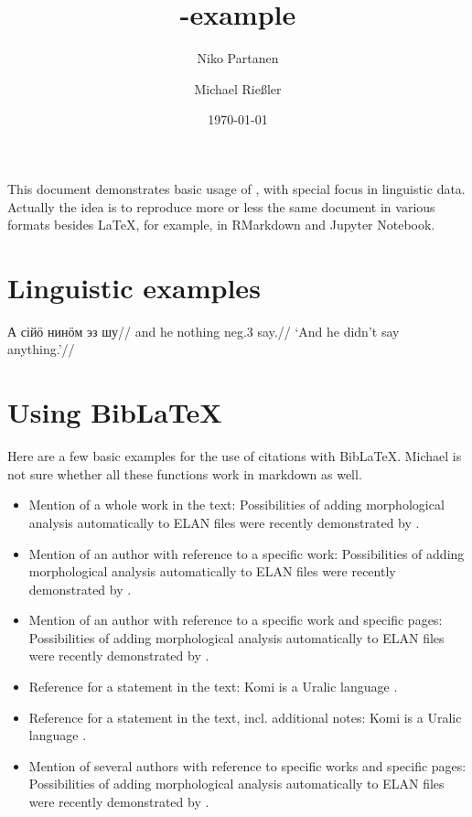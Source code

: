 \documentclass[a4paper, 12pt, english]{article}
\title{\XeLaTeX-example}
\author{
	Niko Partanen
	\and
	Michael Rießler
	}
\date{\today}
\begin{document}
\maketitle 

This document demonstrates basic usage of \XeLaTeX, with special focus in linguistic data. Actually the idea is to reproduce more or less the same document in various formats besides LaTeX, for example, in RMarkdown and Jupyter Notebook.


\section{Linguistic examples}

\ex
\begingl
\gla А сійӧ нинӧм эз шу//
\glb and he nothing neg.3 say.//
\glft ‘And he didn't say anything.’//
\endgl
\xe 

\section{Using BibLaTeX}

Here are a few basic examples for the use of citations with BibLaTeX. Michael is not sure whether all these functions work in markdown as well.

\begin{itemize}
\item Mention of a whole work in the text:
	\subitem Possibilities of adding morphological analysis automatically to ELAN files were recently demonstrated by \cite{gerstenbergerEtAl2017b}.
\item Mention of an author with reference to a specific work:
	\subitem Possibilities of adding morphological analysis automatically to ELAN files were recently demonstrated by \textcite{gerstenbergerEtAl2017b}.
\item Mention of an author with reference to a specific work and specific pages:
	\subitem Possibilities of adding morphological analysis automatically to ELAN files were recently demonstrated by \textcite[10-11]{gerstenbergerEtAl2017b}.
\item Reference for a statement in the text:
	\subitem Komi is a Uralic language \parencite[2]{gerstenbergerEtAl2017b}.
\item Reference for a statement in the text, incl. additional notes:
	\subitem Komi is a Uralic language \parencite[against the statement made by][4]{gerstenbergerEtAl2017b}.
\item Mention of several authors with reference to specific works and specific pages:
	\subitem Possibilities of adding morphological analysis automatically to ELAN files were recently demonstrated by \textcites[10-11]{gerstenbergerEtAl2017b}[2]{gerstenbergerEtAl2017a}.
\end{itemize}
   
\printbibliography
\end{document}
